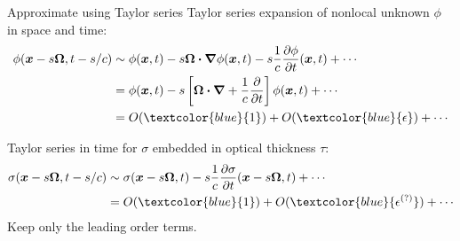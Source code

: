 \documentclass{beamer}
\newcommand{\epsiloncolor}[1]{\textcolor{blue}{#1}}
\begin{document}
\begin{frame}{Approximate using Taylor series}
  Taylor series expansion of nonlocal unknown $\phi$ in space and time:
  \begin{align*}
  \phi(\vec{x} - s \vec{\Omega}, t-s/c)
  &\sim
  \phi(\vec{x}, t) - s \vec{\Omega} \vd \del \phi(\vec{x}, t)
  - s\frac{1}{c} \pder{\phi}{t}(\vec{x}, t) + \cdots
  \\
  &= \phi(\vec{x}, t) - s \left[ \vec{\Omega} \vd \del
  + \frac{1}{c} \pder{}{t} \right] \phi(\vec{x}, t) + \cdots
  \\
  &= O(\epsiloncolor{1}) +
  O(\epsiloncolor{\epsilon}) + \cdots
  \end{align*}

  Taylor series in time for $\sigma$ embedded in optical thickness $\tau$:
\begin{align*}
  \sigma(\vec{x} - s \vec{\Omega}, t-s/c)
  &\sim
  \sigma(\vec{x} - s \vec{\Omega}, t)
  - s\frac{1}{c} \pder{\sigma}{t}(\vec{x} - s \vec{\Omega}, t) + \cdots
  \\
  &= O(\epsiloncolor{1}) + O(\epsiloncolor{\epsilon^{(?)}}) + \cdots
\end{align*}
Keep only the leading order terms.
\end{frame}
\end{document}
